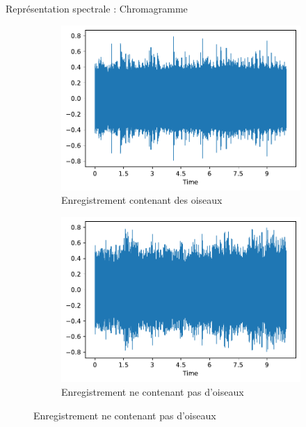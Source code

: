 \documentclass[compress,xcolor=table]{beamer}
\begin{document}
\begin{frame}{Représentation spectrale : Chromagramme}
    

    \begin{figure}[ht]
        \centering
        \begin{subfigure}[b]{0.45\textwidth}
            \includegraphics[width=\textwidth]{images/audio/birds.wave.birdvox.pdf}
            \caption{Enregistrement contenant des oiseaux}
            \label{fig:1}
        \end{subfigure}
        \hfill
        \begin{subfigure}[b]{0.45\textwidth}
            \centering
            \includegraphics[width=\textwidth]{images/audio/nobirds.wave.birdvox.pdf}
            \caption{Enregistrement ne contenant pas d'oiseaux}
            \label{fig:2}
        \end{subfigure}
    \end{figure}
    

\end{frame}
\end{document}
